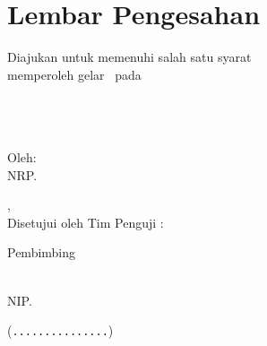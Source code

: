 \chapter*{Lembar Pengesahan}


\begin{center}
	\begin{minipage}{0.9\linewidth}
		\centering
		\textbf{\MakeUppercase{\titleBahasa}}
	\end{minipage}

	\vspace{1.25em}

	\textbf{\MakeUppercase{\documentNameBahasa}}

	Diajukan untuk memenuhi salah satu syarat \\
	memperoleh gelar \degreeName\ pada \\
	\programName \\
	\departmentNameBahasa \\
	\facultyNameBahasa \\
	\campusName

	\vspace{1.25em}

	Oleh: \textbf{\MakeUppercase{\theAuthor}} \\
	NRP. \theAuthorId

	\vspace{1.25em}

	\theCity, \theMonth\ \theYear \\
	Disetujui oleh Tim Penguji \documentNameBahasa:

	\vspace{0.75em}

	Pembimbing

	\vspace{0.75em}

	\begin{minipage}{0.875\linewidth}
		\begin{minipage}{0.6\linewidth}
			\supervisor \\
			NIP. \supervisorId
		\end{minipage}
		\hfill
		\begin{minipage}{0.275\linewidth}
			\begin{flushright}
				(\texttt{...............})
			\end{flushright}
		\end{minipage}
	\end{minipage}


\end{center}
